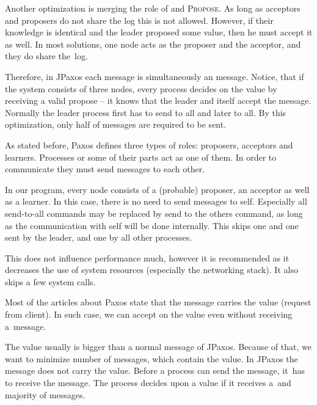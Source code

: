 
Another optimization is merging the role of \accept and \textsc{Propose}. As long as \linebreak acceptors and proposers do not share the log this is not allowed. However, if their knowledge is identical and the leader proposed some value, then he must accept it as well. In most solutions, one node acts as the proposer and the acceptor, and they do share the~log.

Therefore, in JPaxos each \propose message is simultaneously an \accept message. Notice, that if the system consists of three nodes, every process decides on the value by receiving a valid propose -- it knows that the leader and itself
accept the message. Normally the leader process first has to send \propose to all and later \accept to all. By this optimization, only half of messages are required to be sent.


As stated before, Paxos defines three types of roles: proposers, acceptors and learners. Processes or some of their parts act as one of them. In order to communicate they must send messages to each other.

In our program, every node consists of a (probable) proposer, an acceptor as well as a learner. In this case, there is no need to send messages to self. Especially all send-to-all commands may be replaced by send to the others command, as long as the communication with self will be done internally. This skips one \accept and one \propose sent by the leader, and one \accept by all other processes.

This does not influence performance much, however it is recommended as it decreases the use of system resources (especially the networking stack). It also skips a few system calls.


Most of the articles about Paxos state that the \accept message carries the value (request from client).
In such case, we can accept on the value even without receiving a~\propose message.

The value usually is bigger than a normal message of JPaxos. Because of that, we want to minimize number of messages, which contain the value.
In JPaxos the \accept message does not carry the value. Before a process can send the \accept message, it~has to receive the \propose message. The process decides upon a value if it receives a~\propose and majority of \accept messages.


